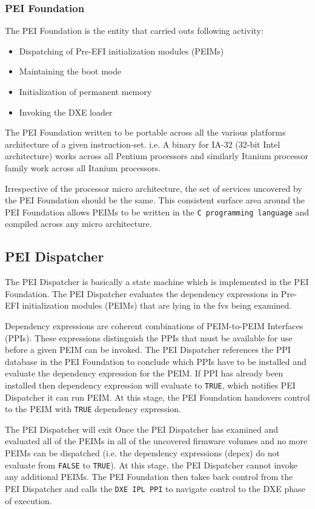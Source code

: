 \subsubsection{PEI Foundation}
The PEI Foundation is the entity that carried outs following activity:
\begin{itemize}
	\item Dispatching of Pre-EFI initialization modules (PEIMs)
	\item Maintaining the boot mode
	\item Initialization of permanent memory
	\item Invoking the DXE loader 
\end{itemize}
The PEI Foundation written to be portable across all the various platforms architecture of a given instruction-set. i.e. A binary for IA-32 (32-bit Intel architecture) works across all Pentium processors and similarly Itanium processor family work across all Itanium processors.

Irrespective of the processor micro architecture, the set of services uncovered by the PEI Foundation should be the same. This consistent surface area around the PEI Foundation allows PEIMs to be written in the \verb|C programming language| and compiled across any micro architecture.

\subsection{PEI Dispatcher}
The PEI Dispatcher is basically a state machine which is implemented in the PEI Foundation. The PEI Dispatcher evaluates the dependency expressions in Pre-EFI initialization modules (PEIMs) that are lying in the \gls{fv}s being examined.

Dependency expressions are coherent combinations of PEIM-to-PEIM Interfaces (PPIs). These expressions distinguish the PPIs that must be available for use before a given PEIM can be invoked. The PEI Dispatcher references the PPI database in the PEI Foundation to conclude which PPIs have to be installed and evaluate the dependency expression for the PEIM. If PPI has already been installed then dependency expression will evaluate to \verb|TRUE|, which notifies  PEI Dispatcher it can run PEIM. At this stage, the PEI Foundation handovers control to the PEIM with \verb|TRUE| dependency expression. 

The PEI Dispatcher will exit Once the PEI Dispatcher has examined and evaluated all of the PEIMs in all of the uncovered firmware volumes and no more PEIMs can be dispatched (i.e. the dependency expressions (\gls{depex}) do not evaluate from \verb|FALSE| to \verb|TRUE|). At this stage, the PEI Dispatcher cannot invoke any additional PEIMs. The PEI Foundation then takes back control from the PEI Dispatcher and calls the \verb|DXE IPL PPI| to navigate control to the DXE phase of execution.


